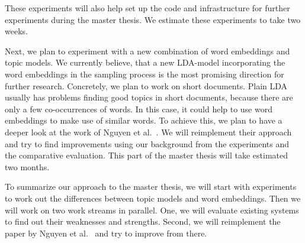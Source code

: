 \documentclass{sig-alternate-05-2015}
\begin{document}
These experiments will also help set up the code and infrastructure for further experiments during the master thesis.
We estimate these experiments to take two weeks.

Next, we plan to experiment with a new combination of word embeddings and topic models.
We currently believe, that a new LDA-model incorporating the word embeddings in the sampling process is the most promising direction for further research.
Concretely, we plan to work on short documents.
Plain LDA usually has problems finding good topics in short documents, because there are only a few co-occurrences of words.
In this case, it could help to use word embeddings to make use of similar words.
To achieve this, we plan to have a deeper look at the work of Nguyen et al.~\cite{Nguyen2015}.
We will reimplement their approach and try to find improvements using our background from the experiments and the comparative evaluation.
This part of the master thesis will take estimated two months.

To summarize our approach to the master thesis, we will start with experiments to work out the differences between topic models and word embeddings.
Then we will work on two work streams in parallel.
One, we will evaluate existing systems to find out their weaknesses and strengths.
Second, we will reimplement the paper by Nguyen et al.~\cite{Nguyen2015} and try to improve from there.


\end{document}
